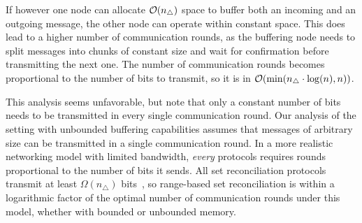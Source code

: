 \documentclass[conference]{IEEEtran}
\begin{document}
If however one node can allocate $\mathcal{O}(n_{\triangle})$ space to buffer both an incoming and an outgoing message, the other node can operate within constant space. This does lead to a higher number of communication rounds, as the buffering node needs to split messages into chunks of constant size and wait for confirmation before transmitting the next one. The number of communication rounds becomes proportional to the number of bits to transmit, so it is in $\mathcal{O}(\min(n_{\triangle} \cdot \log(n), n))$.

This analysis seems unfavorable, but note that only a constant number of bits needs to be transmitted in every single communication round. Our analysis of the setting with unbounded buffering capabilities assumes that messages of arbitrary size can be transmitted in a single communication round. In a more realistic networking model with limited bandwidth, \textit{every} protocols requires rounds proportional to the number of bits it sends. All set reconciliation protocols transmit at least $\Omega(n_{\triangle})$ bits~\cite{minsky2003set}, so range-based set reconciliation is within a logarithmic factor of the optimal number of communication rounds under this model, whether with bounded or unbounded memory.



\end{document}
